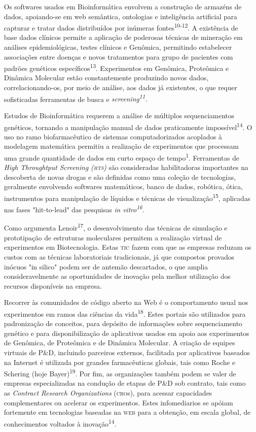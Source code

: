 \documentclass{article}
\begin{document}
Os softwares usados em Bioinformática envolvem a construção de armazéns de
dados, apoiando-se em web semântica, ontologias e inteligência artificial para
capturar e tratar dados distribuídos por inúmeras fontes\textsuperscript{10-12}. A existência de base dados clínicos permite a aplicação de poderosas técnicas
de mineração em análises epidemiológicas, testes clínicos e Genômica, permitindo
estabelecer associações entre doenças e novos tratamentos para grupo de
pacientes com padrões genéticos específicos\textsuperscript{13}. Experimentos em Genômica, Proteômica e Dinâmica Molecular estão constantemente
produzindo novos dados, correlacionando-os, por meio de análise, aos dados já
existentes, o que requer sofisticadas ferramentas de busca e
\textit{screening\textsuperscript{11}.}

Estudos de Bioinformática requerem a análise de múltiplos sequenciamentos
genéticos, tornando a manipulação manual de dados praticamente
impossível\textsuperscript{14}. O uso no ramo biofarmacêutico de sistemas computadorizados acoplados à
modelagem matemática permitiu a realização de experimentos que processam uma
grande quantidade de dados em curto espaço de tempo\textsuperscript{1}. Ferramentas de \textit{High Throughtput Screening (\textsc{hts})}
são consideradas habilitadoras importantes na descoberta de novas drogas e são
definidas como uma coleção de tecnologias, geralmente envolvendo softwares
matemáticos, banco de dados, robótica, ótica, instrumentos para manipulação de
líquidos e técnicas de visualização\textsuperscript{15}, aplicadas nas fases "hit-to-lead" das pesquisas \textit{in
vitro\textsuperscript{16}}.

Como argumenta Lenoir\textsuperscript{17}, o desenvolvimento das técnicas de simulação e prototipação de estruturas
moleculares permitem a realização virtual de experimentos em Biotecnologia.
Estas \textsc{tic} fazem com que as empresas reduzam os custos com as técnicas
laboratoriais tradicionais, já que compostos provados inócuos "in silico" podem
ser de antemão descartados, o que amplia consideravelmente as oportunidades de
inovação pela melhor utilização dos recursos disponíveis na empresa.

Recorrer às comunidades de código aberto na Web é o comportamento usual nos
experimentos em ramos das ciências da vida\textsuperscript{18}. Estes portais são utilizados para padronização de conceitos, para depósito de
informações sobre sequenciamento genético e para disponibilização de aplicativos
usados em apoio aos experimentos de Genômica, de Proteômica e de Dinâmica
Molecular. A criação de equipes virtuais de P\&D, incluindo parceiros externos,
facilitada por aplicativos baseados na Internet é utilizada por grandes
farmacêuticas globais, tais como Roche e Schering (hoje
Bayer)\textsuperscript{19}. Por fim, as organizações também podem se valer de empresas especializadas na
condução de etapas de P\&D sob contrato, tais como as \textit{Contract Research
Organizations}
(\textsc{cro}s), para acessar capacidades complementares ou acelerar os experimentos.
Estes infomediarios se apóiam fortemente em tecnologias baseadas na \textsc{web} para a
obtenção, em escala global, de conhecimentos voltados à
inovação\textsuperscript{14}.
\end{document}

